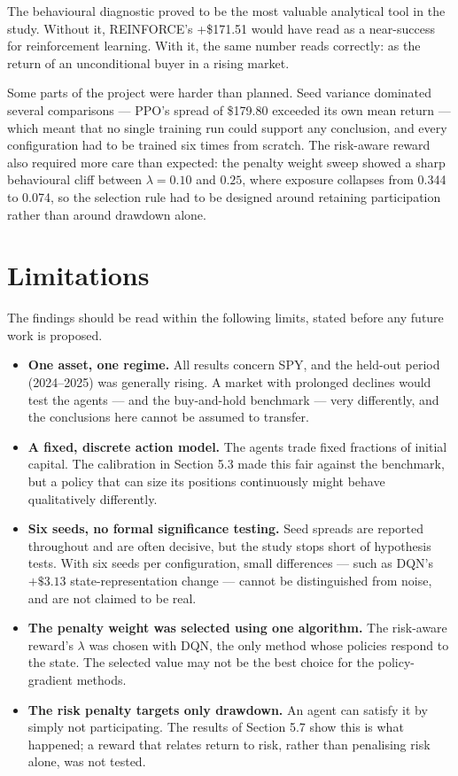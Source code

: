 The behavioural diagnostic proved to be the most valuable analytical tool
in the study. Without it, REINFORCE's +\$171.51 would have read as a
near-success for reinforcement learning. With it, the same number reads
correctly: as the return of an unconditional buyer in a rising market.

Some parts of the project were harder than planned. Seed variance dominated
several comparisons --- PPO's spread of \$179.80 exceeded its own mean
return --- which meant that no single training run could support any
conclusion, and every configuration had to be trained six times from
scratch. The risk-aware reward also required more care than expected: the
penalty weight sweep showed a sharp behavioural cliff between $\lambda =
0.10$ and $0.25$, where exposure collapses from 0.344 to 0.074, so the
selection rule had to be designed around retaining participation rather
than around drawdown alone.

\section{Limitations}

The findings should be read within the following limits, stated before any
future work is proposed.

\begin{itemize}
\item
  \textbf{One asset, one regime.} All results concern SPY, and the
  held-out period (2024--2025) was generally rising. A market with
  prolonged declines would test the agents --- and the buy-and-hold
  benchmark --- very differently, and the conclusions here cannot be
  assumed to transfer.
\item
  \textbf{A fixed, discrete action model.} The agents trade fixed
  fractions of initial capital. The calibration in Section 5.3 made this
  fair against the benchmark, but a policy that can size its positions
  continuously might behave qualitatively differently.
\item
  \textbf{Six seeds, no formal significance testing.} Seed spreads are
  reported throughout and are often decisive, but the study stops short
  of hypothesis tests. With six seeds per configuration, small
  differences --- such as DQN's $+\$3.13$ state-representation change ---
  cannot be distinguished from noise, and are not claimed to be real.
\item
  \textbf{The penalty weight was selected using one algorithm.} The
  risk-aware reward's $\lambda$ was chosen with DQN, the only method
  whose policies respond to the state. The selected value may not be the
  best choice for the policy-gradient methods.
\item
  \textbf{The risk penalty targets only drawdown.} An agent can satisfy
  it by simply not participating. The results of Section 5.7 show this
  is what happened; a reward that relates return to risk, rather than
  penalising risk alone, was not tested.
\end{itemize}

